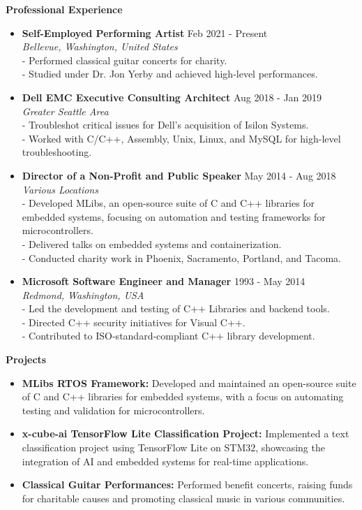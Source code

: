 \documentclass[a4paper,10pt]{article}
\begin{document}
\textbf{Professional Experience} \\
\begin{itemize}[leftmargin=0.5cm]
    \item \textbf{Self-Employed Performing Artist} \hfill Feb 2021 - Present \\
    \textit{Bellevue, Washington, United States} \\
    - Performed classical guitar concerts for charity. \\
    - Studied under Dr. Jon Yerby and achieved high-level performances.
    
    \item \textbf{Dell EMC Executive Consulting Architect} \hfill Aug 2018 - Jan 2019 \\
    \textit{Greater Seattle Area} \\
    - Troubleshot critical issues for Dell’s acquisition of Isilon Systems. \\
    - Worked with C/C++, Assembly, Unix, Linux, and MySQL for high-level troubleshooting.

    \item \textbf{Director of a Non-Profit and Public Speaker} \hfill May 2014 - Aug 2018 \\
    \textit{Various Locations} \\
    - Developed MLibs, an open-source suite of C and C++ libraries for embedded systems, focusing on automation and testing frameworks for microcontrollers. \\
    - Delivered talks on embedded systems and containerization. \\
    - Conducted charity work in Phoenix, Sacramento, Portland, and Tacoma.

    \item \textbf{Microsoft Software Engineer and Manager} \hfill 1993 - May 2014 \\
    \textit{Redmond, Washington, USA} \\
    - Led the development and testing of C++ Libraries and backend tools. \\
    - Directed C++ security initiatives for Visual C++. \\
    - Contributed to ISO-standard-compliant C++ library development.
\end{itemize}

\textbf{Projects} \\
\begin{itemize}[leftmargin=0.5cm]
    \item \textbf{MLibs RTOS Framework:} Developed and maintained an open-source suite of C and C++ libraries for embedded systems, with a focus on automating testing and validation for microcontrollers.
    \item \textbf{x-cube-ai TensorFlow Lite Classification Project:} Implemented a text classification project using TensorFlow Lite on STM32, showcasing the integration of AI and embedded systems for real-time applications.
    \item \textbf{Classical Guitar Performances:} Performed benefit concerts, raising funds for charitable causes and promoting classical music in various communities.
\end{itemize}
\end{document}
